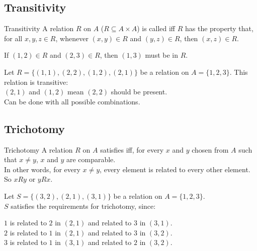 \documentclass[\main/notes.tex]{subfiles}
\begin{document}
			\subsection{Transitivity}
				\begin{definition}{Transitivity}
					A relation $R$ on $A$ ($R \subseteq A \times A$) is called  iff $R$ has the property that, for all $x, y, z \in R$, whenever $(x, y) \in R$ and $(y, z) \in R$, then $(x, z) \in R$.
				\end{definition}
				\begin{example}[hbox]
					If $(1, 2) \in R$ and $(2, 3) \in R$, then $(1, 3)$ must be in $R$.
				\end{example}
				\begin{example}
					Let $R = \bigl\{(1, 1), (2, 2), (1, 2), (2, 1)\bigr\}$ be a relation on $A = \{1, 2, 3\}$. This relation is transitive:\\
					$(2, 1)$ and $(1, 2)$ mean $(2, 2)$ should be present.\\
					Can be done with all possible combinations.
				\end{example}
			\pagebreak
			\subsection{Trichotomy}
				\begin{definition}{Trichotomy}
					A relation $R$ on $A$ satisfies  iff, for every $x$ and $y$ chosen from $A$ such that $x \neq y$, $x$ and $y$ are comparable.\\
					In other words, for every $x \neq y$, every element is related to every other element. So $x R y$ or $y R x$.
				\end{definition}
				\begin{example}[width=0.75\textwidth]
					Let $S = \bigl\{(3, 2), (2, 1), (3, 1)\bigr\}$ be a relation on $A = \{1, 2, 3\}$.\\
					$S$ satisfies the requirements for trichotomy, since:
					\begin{indentparagraph}
						$1$ is related to $2$ in $(2, 1)$ and related to $3$ in $(3, 1)$.\\
						$2$ is related to $1$ in $(2, 1)$ and related to $3$ in $(3, 2)$.\\
						$3$ is related to $1$ in $(3, 1)$ and related to $2$ in $(3, 2)$.
					\end{indentparagraph}
				\end{example}
\end{document}
